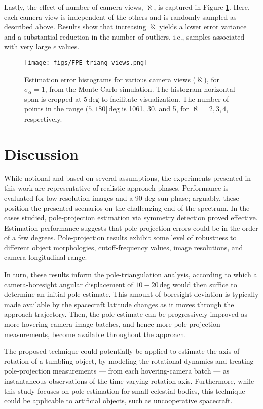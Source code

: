 Lastly, the effect of number of camera views, $\aleph$, is captured in Figure \ref{fig:FPE_triang_views}. Here, each camera view is independent of the others and is randomly sampled as described above. Results show that increasing $\aleph$ yields a lower error variance and a substantial reduction in the number of outliers, i.e., samples associated with very large $\epsilon$ values.

\begin{figure}
    \centering
    \texttt{[image: figs/FPE\_triang\_views.png]}
    \caption{Estimation error histograms for various camera views ($\aleph$), for $\sigma_\alpha=1$, from the Monte Carlo simulation. The histogram horizontal span is cropped at $5\,\mathrm{deg}$ to facilitate visualization. The number of points in the range $(5,180]\,\mathrm{deg}$ is 1061, 30, and 5, for $\aleph=2,3,4$, respectively.}
    \label{fig:FPE_triang_views}
\end{figure}

\section{Discussion}

While notional and based on several assumptions, the experiments presented in this work are representative of realistic approach phases. Performance is evaluated for low-resolution images and a 90-deg sun phase; arguably, these position the presented scenarios on the challenging end of the spectrum. In the cases studied, pole-projection estimation via symmetry detection proved effective. Estimation performance suggests that pole-projection errors could be in the order of a few degrees. Pole-projection results exhibit some level of robustness to different object morphologies, cutoff-frequency values, image resolutions, and camera longitudinal range.

In turn, these results inform the pole-triangulation analysis, according to which a camera-boresight angular displacement of $10-20\,\mathrm{deg}$ would then suffice to determine an initial pole estimate. This amount of boresight deviation is typically made available by the spacecraft latitude changes as it moves through the approach trajectory. Then, the pole estimate can be progressively improved as more hovering-camera image batches, and hence more pole-projection measurements, become available throughout the approach.

The proposed technique could potentially be applied to estimate the axis of rotation of a tumbling object, by modeling the rotational dynamics and treating pole-projection measurements --- from each hovering-camera batch --- as instantaneous observations of the time-varying rotation axis. Furthermore, while this study focuses on pole estimation for small celestial bodies, this technique could be applicable to artificial objects, such as uncooperative spacecraft.

